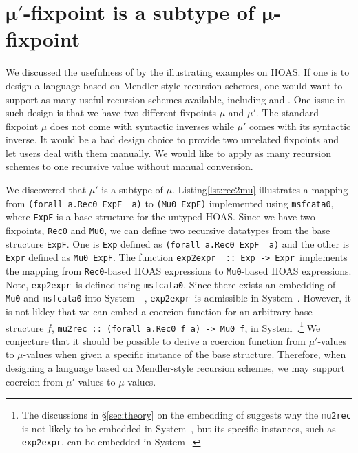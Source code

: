\section{$\pmb{\mu'}$-fixpoint is a subtype of $\pmb{\mu}$-fixpoint}\label{sec:murec}
We discussed the usefulness of \msfit{} by the illustrating examples on HOAS.
If one is to design a language based on Mendler-style recursion schemes,
one would want to support as many useful recursion schemes available,
including \MIt{} and \msfit{}. One issue in such design is that we have
two different fixpoints $\mu$ and $\mu'$. The standard fixpoint $\mu$
does not come with syntactic inverses while $\mu'$ comes with
its syntactic inverse. It would be a bad design choice to provide 
two unrelated fixpoints and let users deal with them manually.
We would like to apply as many recursion schemes to one recursive value
without manual conversion.

\begin{figure}

\vspace*{-3ex}
\end{figure}

We discovered that $\mu'$ is a subtype of $\mu$. Listing\;\ref{lst:rec2mu}
illustrates a mapping from \lstinline{(forall a.Rec0 ExpF  a)}
to \lstinline{(Mu0 ExpF)} implemented using \lstinline{msfcata0},
where \lstinline{ExpF} is a base structure for the untyped HOAS.
Since we have two fixpoints, \lstinline{Rec0} and \lstinline{Mu0},
we can define two recursive datatypes from the base structure \lstinline{ExpF}.
One is \lstinline{Exp} defined as \lstinline{(forall a.Rec0 ExpF  a)} and
the other is \lstinline{Expr} defined as \lstinline{Mu0 ExpF}.
The function \lstinline{exp2expr  :: Exp -> Expr}\, implements the mapping from
\lstinline{Rec0}-based HOAS expressions to \lstinline{Mu0}-based
HOAS expressions. Note, \lstinline{exp2expr}\, is defined
using \lstinline{msfcata0}.  Since there exists an embedding of
\lstinline{Mu0} and \lstinline{msfcata0} into System~\Fw\ \cite{AhnShe11},
\lstinline{exp2expr}\, is admissible in System~\Fw. However, it is not likley
that we can embed a coercion function for an arbitrary base structure $f$,
\lstinline{mu2rec :: (forall a.Rec0 f a) -> Mu0 f}, in System~\Fw.\footnote{
	The discussions in \S\ref{sec:theory} on the embedding of \msfit{}
	suggests why the \lstinline{mu2rec} is not likely to be embedded
	in System~\Fw, but its specific instances, such as
	\lstinline{exp2expr}, can be embedded in System~\Fw.}
We conjecture that it should be possible to derive a coercion function
from $\mu'$-values to $\mu$-values when given a specific instance of
the base structure. Therefore, when designing a language based on Mendler-style
recursion schemes, we may support coercion from $\mu'$-values to $\mu$-values.

